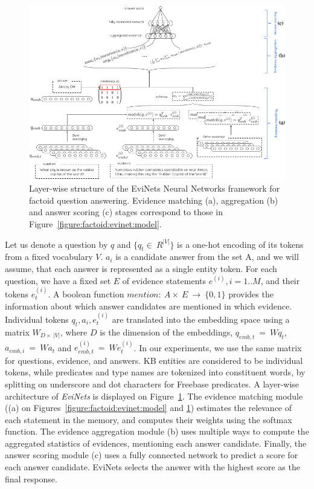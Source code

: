 \begin{figure}[t]
\centering
\includegraphics[width=\textwidth]{img/EviNetLayers}
\caption{Layer-wise structure of the EviNets Neural Networks framework for factoid question answering. Evidence matching (a), aggregation (b) and answer scoring (c) stages correspond to those in Figure~\ref{figure:factoid:evinet:model}.}
\label{figure:factoid:evinet:layers}
\end{figure}

Let us denote a question by $q$ and $\{q_t\in~R^{|V|}\}$ is a one-hot encoding of its tokens from a fixed vocabulary $V$.
$a_i$ is a candidate answer from the set A, and we will assume, that each answer is represented as a single entity token.
For each question, we have a fixed set $E$ of evidence statements $e^{(i)}, i=1..M$, and their tokens $e_t^{(i)}$.
A boolean function $mention:~A\times~E~\rightarrow~\{0, 1\}$ provides the information about which answer candidates are mentioned in which evidence.
Individual tokens $q_t, a_i, e_t^{(i)}$ are translated into the embedding space using a matrix $W_{D\times~|V|}$, where $D$ is the dimension of the embeddings, \ie $q_{emb,t}~=~Wq_t$, $a_{emb,i}~=~Wa_t$ and $e^{(i)}_{emb,t}~=~We^{(i)}_t$.
In our experiments, we use the same matrix for questions, evidence, and answers.
KB entities are considered to be individual tokens, while predicates and type names are tokenized into constituent words, \eg by splitting on underscore and dot characters for Freebase predicates.
A layer-wise architecture of \textit{EviNets} is displayed on Figure~\ref{figure:factoid:evinet:layers}.
The evidence matching module ((a) on Figures~\ref{figure:factoid:evinet:model} and \ref{figure:factoid:evinet:layers}) estimates the relevance of each statement in the memory, and computes their weights using the softmax function.
The evidence aggregation module (b) uses multiple ways to compute the aggregated statistics of evidences, mentioning each answer candidate.
Finally, the answer scoring module (c) uses a fully connected network to predict a score for each answer candidate.
EviNets selects the answer with the highest score as the final response.

